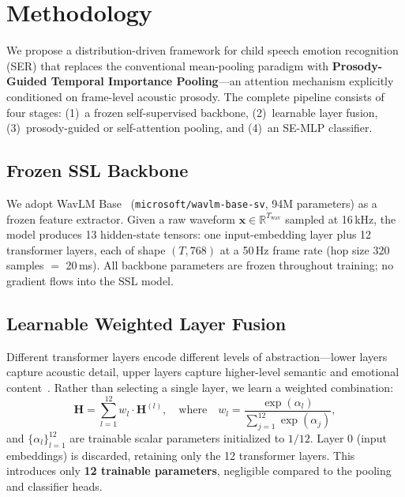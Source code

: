 \section{Methodology}
\label{sec:methodology}

We propose a distribution-driven framework for child speech emotion recognition (SER) that replaces the conventional mean-pooling paradigm with \textbf{Prosody-Guided Temporal Importance Pooling}---an attention mechanism explicitly conditioned on frame-level acoustic prosody.
The complete pipeline consists of four stages: (1)~a frozen self-supervised backbone, (2)~learnable layer fusion, (3)~prosody-guided or self-attention pooling, and (4)~an SE-MLP classifier.

\subsection{Frozen SSL Backbone}
\label{ssec:backbone}

We adopt WavLM Base~\cite{chen2022wavlm} (\texttt{microsoft/wavlm-base-sv}, 94M parameters) as a frozen feature extractor.
Given a raw waveform $\mathbf{x} \in \mathbb{R}^{T_{\text{wav}}}$ sampled at 16\,kHz, the model produces 13 hidden-state tensors: one input-embedding layer plus 12 transformer layers, each of shape $(T, 768)$ at a 50\,Hz frame rate (hop size 320 samples $=$ 20\,ms).
All backbone parameters are frozen throughout training; no gradient flows into the SSL model.

\subsection{Learnable Weighted Layer Fusion}
\label{ssec:layer_fusion}

Different transformer layers encode different levels of abstraction---lower layers capture acoustic detail, upper layers capture higher-level semantic and emotional content~\cite{pasad2021layer}.
Rather than selecting a single layer, we learn a weighted combination:
\begin{equation}
\mathbf{H} = \sum_{l=1}^{12} w_l \cdot \mathbf{H}^{(l)}, \quad \text{where} \quad w_l = \frac{\exp(\alpha_l)}{\sum_{j=1}^{12}\exp(\alpha_j)},
\label{eq:layer_fusion}
\end{equation}
and $\{\alpha_l\}_{l=1}^{12}$ are trainable scalar parameters initialized to $1/12$.
Layer 0 (input embeddings) is discarded, retaining only the 12 transformer layers.
This introduces only \textbf{12 trainable parameters}, negligible compared to the pooling and classifier heads.

